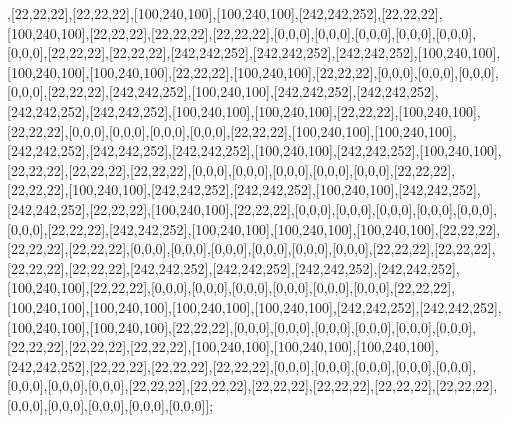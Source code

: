 ,[22,22,22],[22,22,22],[100,240,100],[100,240,100],[242,242,252],[22,22,22],[100,240,100],[22,22,22],[22,22,22],[22,22,22],[0,0,0],[0,0,0],[0,0,0],[0,0,0],[0,0,0],[0,0,0],[22,22,22],[22,22,22],[242,242,252],[242,242,252],[242,242,252],[100,240,100],[100,240,100],[100,240,100],[22,22,22],[100,240,100],[22,22,22],[0,0,0],[0,0,0],[0,0,0],[0,0,0],[22,22,22],[242,242,252],[100,240,100],[242,242,252],[242,242,252],[242,242,252],[242,242,252],[100,240,100],[100,240,100],[22,22,22],[100,240,100],[22,22,22],[0,0,0],[0,0,0],[0,0,0],[0,0,0],[22,22,22],[100,240,100],[100,240,100],[242,242,252],[242,242,252],[242,242,252],[100,240,100],[242,242,252],[100,240,100],[22,22,22],[22,22,22],[22,22,22],[0,0,0],[0,0,0],[0,0,0],[0,0,0],[0,0,0],[22,22,22],[22,22,22],[100,240,100],[242,242,252],[242,242,252],[100,240,100],[242,242,252],[242,242,252],[22,22,22],[100,240,100],[22,22,22],[0,0,0],[0,0,0],[0,0,0],[0,0,0],[0,0,0],[0,0,0],[22,22,22],[242,242,252],[100,240,100],[100,240,100],[100,240,100],[22,22,22],[22,22,22],[22,22,22],[0,0,0],[0,0,0],[0,0,0],[0,0,0],[0,0,0],[0,0,0],[22,22,22],[22,22,22],[22,22,22],[22,22,22],[242,242,252],[242,242,252],[242,242,252],[242,242,252],[100,240,100],[22,22,22],[0,0,0],[0,0,0],[0,0,0],[0,0,0],[0,0,0],[0,0,0],[22,22,22],[100,240,100],[100,240,100],[100,240,100],[100,240,100],[242,242,252],[242,242,252],[100,240,100],[100,240,100],[22,22,22],[0,0,0],[0,0,0],[0,0,0],[0,0,0],[0,0,0],[0,0,0],[22,22,22],[22,22,22],[22,22,22],[100,240,100],[100,240,100],[100,240,100],[242,242,252],[22,22,22],[22,22,22],[22,22,22],[0,0,0],[0,0,0],[0,0,0],[0,0,0],[0,0,0],[0,0,0],[0,0,0],[0,0,0],[22,22,22],[22,22,22],[22,22,22],[22,22,22],[22,22,22],[22,22,22],[0,0,0],[0,0,0],[0,0,0],[0,0,0],[0,0,0]];

